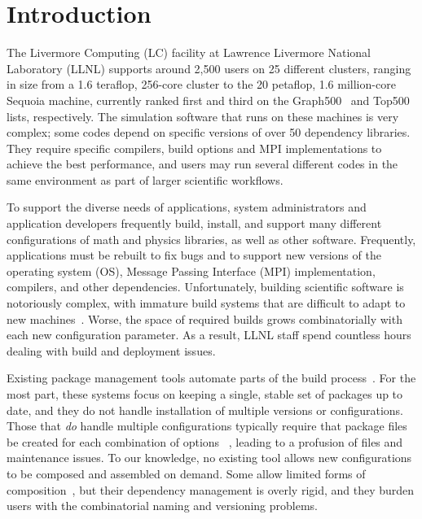 
\section{Introduction}
\label{sec:intro}

The Livermore Computing (LC) facility at Lawrence Livermore National Laboratory
(LLNL) supports around 2,500 users on 25 different clusters, ranging
in size from a 1.6 teraflop, 256-core cluster to the
20 petaflop, 1.6 million-core Sequoia machine, currently ranked first and
third on the Graph500~\cite{graph500} and Top500~\cite{top500}
lists, respectively.
%
%
The simulation software that runs on these machines is very complex; some
codes depend on specific versions of over 50 dependency libraries.
They require specific compilers, build options and MPI implementations to
achieve the best performance, and users may run several
different codes in the same environment as part of larger
scientific workflows.

To support the diverse needs of applications, system administrators
and application developers frequently build, install, and support many
different configurations of math and physics libraries, as well as
other software.  Frequently, applications must be rebuilt to fix bugs
and to support new versions of the operating system (OS), Message
Passing Interface (MPI) implementation, compilers, and other
dependencies.  Unfortunately, building scientific software is
notoriously complex, with immature build systems that are difficult to
adapt to new
machines~\cite{dubois+:comp-sci-eng,hoste+:pyhpc12,wilson+:corr}.
Worse, the space of required builds grows combinatorially with each
new configuration parameter. As a result, LLNL staff spend countless
hours dealing with build and deployment issues.

Existing package management tools automate parts of the build
process~\cite{bsdports,digirolamo:smithy,dolstra+:icfp08,dolstra+:lisa04,hashdist,homebrew,hoste+:pyhpc12,macports,thiruvathukal:gentoo04}.
For the most part, these systems focus on keeping a single, stable set of
packages up to date, and they do not handle installation of multiple
versions or configurations.  Those that {\it do} handle multiple configurations
typically require that package files be created for each combination of
options~ \cite{digirolamo:smithy,dolstra+:icfp08,dolstra+:lisa04,hashdist,hoste+:pyhpc12},
leading to a profusion of files and maintenance issues.
To our knowledge, no existing tool allows new configurations to be composed
and assembled on demand.  Some allow limited forms of
composition~\cite{hoste+:pyhpc12,dolstra+:icfp08,dolstra+:lisa04}, but their
dependency management is overly rigid, and they burden users with
the combinatorial naming and versioning problems.

